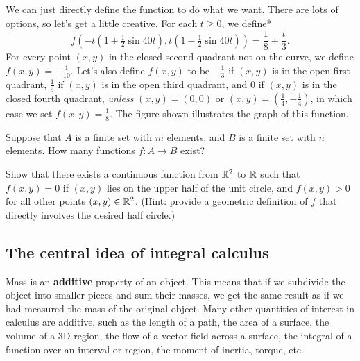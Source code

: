 \documentclass[prettycode,shellescape]{watsonbook}
\begin{document}
\begin{solution}
  \begin{insetfigure}{\usebox{\asybox}}
    We can just directly define the function to do what we want. There
    are lots of options, so let's get a little creative. For each
    $t \geq 0$, we define* 
    \[
      f\left(-t\left(1+\tfrac{1}{2}\sin
          40t\right),t\left(1-\tfrac{1}{2}\sin 40t\right)\right) =
      \frac{1}{8} + \frac{t}{3}. 
    \]
    For every point $(x,y)$ in the closed second quadrant not on the
    curve, we define $f(x,y) = -\tfrac{1}{10}$. Let's also define
    $f(x,y)$ to be $-\tfrac{1}{3}$ if $(x,y)$ is in the open first
    quadrant, $\tfrac{1}{5}$ if $(x,y)$ is in the open third quadrant,
    and 0 if $(x,y)$ is in the closed fourth quadrant, \textit{unless}
    $(x,y) = (0,0)$ or
    $(x,y) = \left(\tfrac{1}{4}, -\tfrac{1}{4}\right)$, in which case
    we set $f(x,y) = \frac{1}{8}$. The figure shown illustrates the
    graph of this function.
  \end{insetfigure}
\end{solution}

\begin{exercise}{}{}
  Suppose that $A$ is a finite set with $m$ elements, and $B$ is a
  finite set with $n$ elements. How many functions $f:A \to B$ exist?
\end{exercise}

\begin{exercise}{}{}
  Show that there exists a continuous function from $\mathbb{R}^2$ to $\mathbb{R}$
  such that $f(x,y) = 0$ if $(x,y)$ lies on the upper half of the unit
  circle, and $f(x,y) > 0$ for all other points $(x,y) \in
  \mathbb{R}^2$. (Hint: provide a geometric definition of $f$ that directly
  involves the desired half circle.)
\end{exercise}

\newpage 

\subsection{The central idea of integral calculus} \label{sec:centralidea}

Mass is an \textbf{additive} property of an object. This means that if
we subdivide the object into smaller pieces and sum their masses, we
get the same result as if we had measured the mass of the original
object. Many other quantities of interest in calculus are additive,
such as the length of a path, the area of a surface, the volume of a
3D region, the flow of a vector field across a surface, the integral
of a function over an interval or region, the moment of inertia,
torque, etc.
\end{document}
